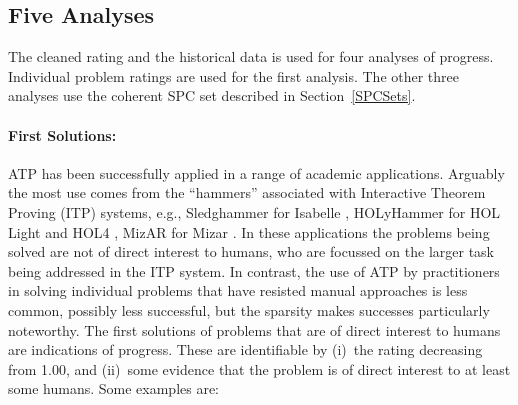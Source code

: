 \documentclass[runningheads]{llncs}
\begin{document}
\subsection{Five Analyses}
\label{AnalysisTypes}

The cleaned rating and the historical data is used for four analyses of progress.
Individual problem ratings are used for the first analysis.
The other three analyses use the coherent SPC set described in Section~\ref{SPCSets}.

\paragraph{First Solutions:}
ATP has been successfully applied in a range of academic applications.
Arguably the most use comes from the ``hammers'' \cite{BK+16} associated with Interactive 
Theorem Proving (ITP) systems, e.g., Sledghammer \cite{PB10} for Isabelle \cite{NPW02}, 
HOLyHammer \cite{KU14} for HOL Light \cite{Har09} and HOL4 \cite{SN08}, 
MizAR \cite{KU15-M40} for Mizar \cite{GKN10}.
In these applications the problems being solved are not of direct interest to humans,
who are focussed on the larger task being addressed in the ITP system.
In contrast, the use of ATP by practitioners in solving individual problems that have resisted
manual approaches is less common, possibly less successful, but the sparsity makes successes 
particularly noteworthy. 
The first solutions of problems that are of direct interest to humans are indications of progress.
These are identifiable by (i)~the rating decreasing from 1.00, and (ii)~some evidence that the 
problem is of direct interest to at least some humans.
Some examples are:
\end{document}
